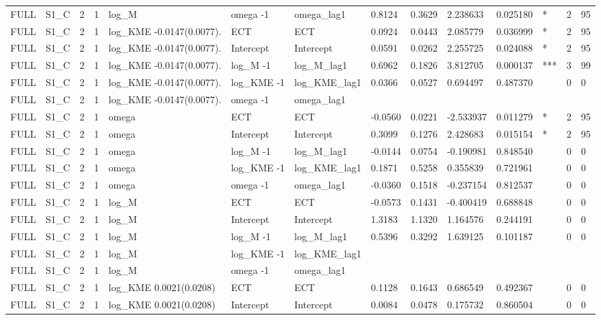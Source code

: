 \begin{tabular}{llllllllllllll}
FULL & S1\_C & 2 & 1 & log\_M & omega -1 & omega\_lag1 & 0.8124 & 0.3629 & 2.238633 & 0.025180 & * & 2 & 95 \\
FULL & S1\_C & 2 & 1 & log\_KME -0.0147(0.0077). & ECT & ECT & 0.0924 & 0.0443 & 2.085779 & 0.036999 & * & 2 & 95 \\
FULL & S1\_C & 2 & 1 & log\_KME -0.0147(0.0077). & Intercept & Intercept & 0.0591 & 0.0262 & 2.255725 & 0.024088 & * & 2 & 95 \\
FULL & S1\_C & 2 & 1 & log\_KME -0.0147(0.0077). & log\_M -1 & log\_M\_lag1 & 0.6962 & 0.1826 & 3.812705 & 0.000137 & *** & 3 & 99 \\
FULL & S1\_C & 2 & 1 & log\_KME -0.0147(0.0077). & log\_KME -1 & log\_KME\_lag1 & 0.0366 & 0.0527 & 0.694497 & 0.487370 &  & 0 & 0 \\
FULL & S1\_C & 2 & 1 & log\_KME -0.0147(0.0077). & omega -1 & omega\_lag1 &  &  &  &  &  &  &  \\
FULL & S1\_C & 2 & 1 & omega & ECT & ECT & -0.0560 & 0.0221 & -2.533937 & 0.011279 & * & 2 & 95 \\
FULL & S1\_C & 2 & 1 & omega & Intercept & Intercept & 0.3099 & 0.1276 & 2.428683 & 0.015154 & * & 2 & 95 \\
FULL & S1\_C & 2 & 1 & omega & log\_M -1 & log\_M\_lag1 & -0.0144 & 0.0754 & -0.190981 & 0.848540 &  & 0 & 0 \\
FULL & S1\_C & 2 & 1 & omega & log\_KME -1 & log\_KME\_lag1 & 0.1871 & 0.5258 & 0.355839 & 0.721961 &  & 0 & 0 \\
FULL & S1\_C & 2 & 1 & omega & omega -1 & omega\_lag1 & -0.0360 & 0.1518 & -0.237154 & 0.812537 &  & 0 & 0 \\
FULL & S1\_C & 2 & 1 & log\_M & ECT & ECT & -0.0573 & 0.1431 & -0.400419 & 0.688848 &  & 0 & 0 \\
FULL & S1\_C & 2 & 1 & log\_M & Intercept & Intercept & 1.3183 & 1.1320 & 1.164576 & 0.244191 &  & 0 & 0 \\
FULL & S1\_C & 2 & 1 & log\_M & log\_M -1 & log\_M\_lag1 & 0.5396 & 0.3292 & 1.639125 & 0.101187 &  & 0 & 0 \\
FULL & S1\_C & 2 & 1 & log\_M & log\_KME -1 & log\_KME\_lag1 &  &  &  &  &  &  &  \\
FULL & S1\_C & 2 & 1 & log\_M & omega -1 & omega\_lag1 &  &  &  &  &  &  &  \\
FULL & S1\_C & 2 & 1 & log\_KME 0.0021(0.0208) & ECT & ECT & 0.1128 & 0.1643 & 0.686549 & 0.492367 &  & 0 & 0 \\
FULL & S1\_C & 2 & 1 & log\_KME 0.0021(0.0208) & Intercept & Intercept & 0.0084 & 0.0478 & 0.175732 & 0.860504 &  & 0 & 0 \\

\end{tabular}
